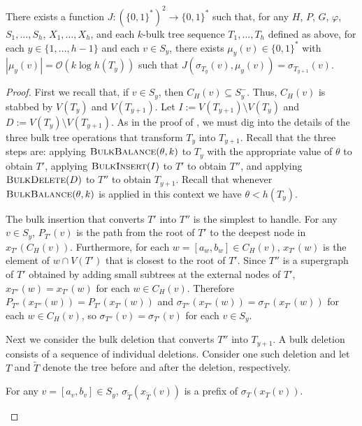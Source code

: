 \documentclass[kpfonts]{patmorin}
\newcommand{\snote}[1]{\fcolorbox{red}{yellow}{#1}}
\newcommand{\Oh}{\mathcal{O}}
\begin{document}
\begin{lem}
  There exists a function $J:(\{0,1\}^*)^2\to \{0,1\}^*$ such that, 
  for any $H$, $P$, $G$, $\varphi$, $S_1,\ldots,S_h$, $X_1,\ldots,X_h$, and each $k$-bulk tree sequence $T_1,\ldots,T_h$ defined as above, for each $y\in\{1,\ldots,h-1\}$ and each $v\in S_y$, there exists $\mu_y(v)\in\{0,1\}^*$ with $|\mu_y(v)|= \Oh(k\log h(T_y))$ such that $J(\sigma_{T_y}(v), \mu_y(v))=\sigma_{T_{y+1}}(v)$.
\end{lem}

\begin{proof}
  First we recall that, if $v\in S_y$, 
  then $C_H(v) \subseteq S^-_y$. 
  Thus, $C_H(v)$ is stabbed by $V(T_y)$ and $V(T_{y+1})$.
  Let $I:=V(T_{y+1})\setminus V(T_{y})$ and $D:=V(T_y)\setminus V(T_{y+1})$.
  As in the proof of , we must dig into the details of the three bulk tree operations that transform $T_y$ into $T_{y+1}$. 
  Recall that the three steps are: 
  applying $\textsc{BulkBalance}(\theta,k)$ to $T_y$ with the appropriate value of $\theta$ to obtain $T'$,
  applying $\textsc{BulkInsert}(I)$ to $T'$ to obtain $T''$, and
  applying $\textsc{BulkDelete}(D)$ to $T''$ to obtain $T_{y+1}$.
  Recall that whenever $\textsc{BulkBalance}(\theta,k)$ is applied in this context we have $\theta < h(T_y)$.



  The bulk insertion that converts $T'$ into $T''$ is the simplest to handle.  For any $v\in S_y$, $P_{T'}(v)$ is the path from the root of $T'$ to the deepest node in $x_{T'}(C_H(v))$.  Furthermore, for each $w=[a_w,b_w]\in C_H(v)$, $x_{T'}(w)$ is the element of $w\cap V(T')$ that is closest to the root of $T'$. Since $T''$ is a supergraph of $T'$ obtained by adding small subtrees at the external nodes of $T'$, $x_{T''}(w)=x_{T'}(w)$ for each $w\in C_H(v)$.  Therefore $P_{T''}(x_{T''}(w))=P_{T'}(x_{T'}(w))$ and $\sigma_{T''}(x_{T''}(w))=\sigma_{T'}(x_{T'}(w))$ for each $w\in C_H(v)$, so $\sigma_{T''}(v)=\sigma_{T'}(v)$ for each $v\in S_y$.

  Next we consider the bulk deletion that converts $T''$ into $T_{y+1}$.  A bulk deletion consists of a sequence of individual deletions. Consider one such deletion and let $T$ and $\tilde{T}$ denote the tree before and after the deletion, respectively.

  \begin{clm}
    For any $v=[a_v,b_v]\in S_y$, $\sigma_{\tilde{T}}(x_{\tilde{T}}(v))$ is a prefix of $\sigma_T(x_T(v))$.
  \end{clm}


\end{proof}
\end{document}
